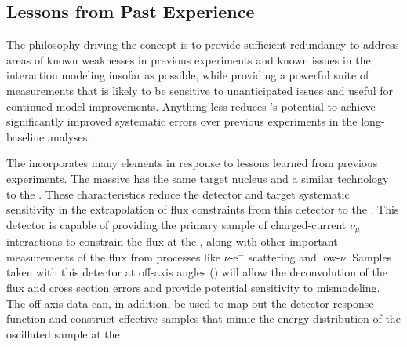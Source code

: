 \subsection{Lessons from Past Experience}
\label{ssec:exsum-nd-overview-experience}

The philosophy driving the    concept is to provide sufficient redundancy to address areas of known weaknesses in previous experiments and known issues in the interaction modeling insofar as possible, while providing a powerful suite of measurements that is likely to be sensitive to unanticipated issues and useful for continued model improvements.  Anything less reduces 's potential to achieve significantly improved systematic errors over previous experiments in the long-baseline analyses. 


The    incorporates many elements in response to lessons learned from previous experiments. 
The massive    has the same target nucleus and a similar technology to the  . These characteristics reduce the detector and target systematic sensitivity in the  extrapolation of flux constraints from this detector to the  .  This detector is capable of providing the primary  sample of charged-current $\nu_{\mu}$ interactions to constrain the flux at the  , along with other important measurements of the flux from processes like $\nu$-e$^{-}$ scattering and low-$\nu$.  Samples taken with this detector at off-axis angles () will allow the deconvolution of the flux and cross section errors and provide potential sensitivity to mismodeling.  The off-axis data can, in addition, be used to map out the detector response function and construct effective   samples that mimic the energy distribution of the oscillated sample at the  . 

